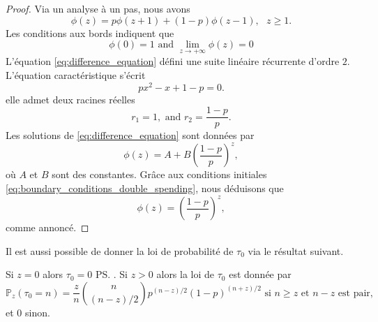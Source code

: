 \begin{proof}
Via un analyse à un pas, nous avons 
\begin{equation}\label{eq:difference_equation}
\phi(z) = p\phi(z+1)+(1-p)\phi(z-1),\text{ }z\geq1.
\end{equation}
Les conditions aux bords indiquent que 
\begin{equation}\label{eq:boundary_conditions_double_spending}
\phi(0) = 1\text{ and }\underset{z\rightarrow +\infty}{\lim}\phi(z) = 0
\end{equation}
L'équation \eqref{eq:difference_equation} défini une suite linéaire récurrente d'ordre $2$. L'équation caractéristique s'écrit
$$
px^2 - x + 1-p = 0.
$$
elle admet deux racines réelles
$$
r_1 = 1, \text{ and }r_2 = \frac{1-p}{p}.
$$
Les solutions de \eqref{eq:difference_equation} sont données par 
$$
\phi(z)=A+B\left(\frac{1-p}{p}\right)^z,
$$
où $A$ et $B$ sont des constantes. Grâce aux conditions initiales \eqref{eq:boundary_conditions_double_spending}, nous déduisons que
$$
\phi(z) = \left(\frac{1-p}{p}\right)^z,
$$
comme annoncé.
\end{proof}
Il est aussi possible de donner la loi de probabilité de $\tau_0$ via le résultat suivant.
\begin{theo}
Si $z = 0$ alors $\tau_0=0$ \ps. Si $z>0$ alors la loi de $\tau_0$ est donnée par
$$
\mathbb{P}_z(\tau_0 = n)=
\frac{z}{n}\binom{n}{(n-z) / 2}p^{(n-z) / 2}(1-p)^{(n
+z) / 2}\text{ si }n\geq z\text{ et }n-z\text{ est pair},
$$
et $0$ sinon.
\end{theo}
